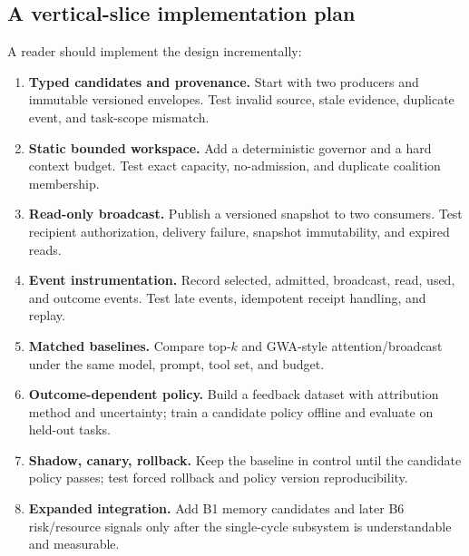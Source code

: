 \subsection{A vertical-slice implementation plan}

A reader should implement the design incrementally:
\begin{enumerate}
  \item \textbf{Typed candidates and provenance.} Start with two producers and immutable versioned envelopes. Test invalid source, stale evidence, duplicate event, and task-scope mismatch.
  \item \textbf{Static bounded workspace.} Add a deterministic governor and a hard context budget. Test exact capacity, no-admission, and duplicate coalition membership.
  \item \textbf{Read-only broadcast.} Publish a versioned snapshot to two consumers. Test recipient authorization, delivery failure, snapshot immutability, and expired reads.
  \item \textbf{Event instrumentation.} Record selected, admitted, broadcast, read, used, and outcome events. Test late events, idempotent receipt handling, and replay.
  \item \textbf{Matched baselines.} Compare top-$k$ and GWA-style attention/broadcast under the same model, prompt, tool set, and budget.
  \item \textbf{Outcome-dependent policy.} Build a feedback dataset with attribution method and uncertainty; train a candidate policy offline and evaluate on held-out tasks.
  \item \textbf{Shadow, canary, rollback.} Keep the baseline in control until the candidate policy passes; test forced rollback and policy version reproducibility.
  \item \textbf{Expanded integration.} Add B1 memory candidates and later B6 risk/resource signals only after the single-cycle subsystem is understandable and measurable.
\end{enumerate}

